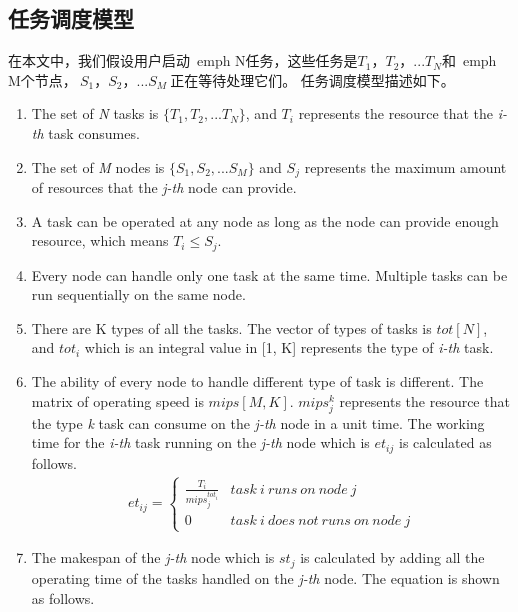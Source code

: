 \subsection{任务调度模型}
在本文中，我们假设用户启动\ emph {N}任务，这些任务是$ {T_1，T_2，... T_N} $和\ emph {M}个节点，$ \ {S_1，S_2，... S_M \ } $正在等待处理它们。 任务调度模型描述如下。
\begin{enumerate}[]
    \item The set of \emph{N} tasks is $\{T_1,T_2,...T_N\}$, and $T_i$ represents the resource that the \emph{i-th} task consumes.
    \item The set of \emph{M} nodes is $\{S_1,S_2,...S_M\}$ and $S_j$ represents the maximum amount of resources that the \emph{j-th} node can provide.
    \item A task can be operated at any node as long as the node can provide enough resource, which means $T_i \leq S_j$.
    \item Every node can handle only one task at the same time. Multiple tasks can be run sequentially on the same node. 
    \item There are K types of all the tasks. The vector of types of tasks is $tot[N]$, and $tot_i$ which is an integral value in [1, K] represents the type of \emph{i-th} task.
    \item The ability of every node to handle different type of task is different. The matrix of operating speed is $mips[M,K]$. $mips_{j}^{k}$ represents the resource that the type \emph{k} task can consume on the \emph{j-th} node in a unit time. The working time for the \emph{i-th} task running on the \emph{j-th} node which is $et_{ij}$ is calculated as follows.
    \begin{eqnarray}
        et_{ij}= \begin{cases}
            \frac{T_i}{mips_{j}^{tot_i}} & task\  i\  runs\  on\  node\  j \\
            0&task\  i\  does\  not\  runs\  on\  node\  j 
            \end{cases} 
    \end{eqnarray}
    \item The makespan of the \emph{j-th} node which is $st_j$ is calculated by adding all the operating time of the tasks handled on the \emph{j-th} node. The equation is shown as follows.

\end{enumerate}
